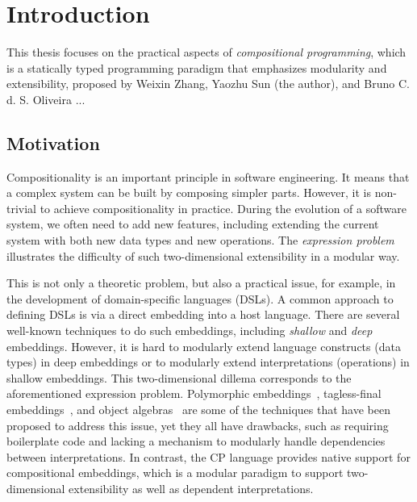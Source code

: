\chapter{Introduction} \label{ch:introduction}

This thesis focuses on the practical aspects of \emph{compositional
programming}, which is a statically typed programming paradigm that emphasizes
modularity and extensibility, proposed by Weixin Zhang, Yaozhu Sun (the author),
and Bruno C. d. S. Oliveira \citeyearpar{zhang2021compositional}...

\section{Motivation}

Compositionality is an important principle in software engineering. It means
that a complex system can be built by composing simpler parts. However, it is
non-trivial to achieve compositionality in practice. During the evolution of a
software system, we often need to add new features, including extending the
current system with both new data types and new operations. The \emph{expression
problem}~\citep{wadler1998expression} illustrates the difficulty of such
two-dimensional extensibility in a modular way.

This is not only a theoretic problem, but also a practical issue, for example,
in the development of domain-specific languages (DSLs). A common approach to
defining DSLs is via a direct embedding into a host language. There are several
well-known techniques to do such embeddings, including \emph{shallow} and
\emph{deep} embeddings. However, it is hard to modularly extend language
constructs (data types) in deep embeddings or to modularly extend
interpretations (operations) in shallow embeddings. This two-dimensional dillema
corresponds to the aforementioned expression problem. Polymorphic
embeddings~\citep{hofer2008polymorphic}, tagless-final
embeddings~\citep{carette2009finally}, and object
algebras~\citep{oliveira2012extensibility} are some of the techniques that have
been proposed to address this issue, yet they all have drawbacks, such as
requiring boilerplate code and lacking a mechanism to modularly handle
dependencies between interpretations. In contrast, the CP language provides
native support for compositional embeddings, which is a modular paradigm to
support two-dimensional extensibility as well as dependent interpretations.

